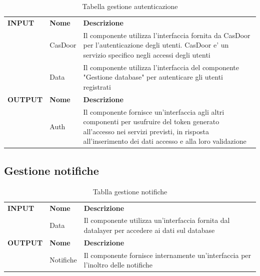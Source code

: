 \documentclass{article}
\begin{document}
\begin{table}[htbp]
    \centering
    \renewcommand{\arraystretch}{1.3} %
    \begin{tabularx}{\textwidth}{| l | l | X |}
        \Xhline{2pt}
        \textbf{INPUT} & \textbf{Nome} & \textbf{Descrizione} \\
        \Xhline{2pt}
         & CasDoor & Il componente utilizza l'interfaccia fornita da CasDoor per l'autenticazione degli utenti. CasDoor e' un servizio specifico negli accessi degli utenti \\
        \hline
         & Data & Il componente utilizza l’interfaccia del componente "Gestione database" per autenticare gli utenti registrati \\
        \Xhline{2pt}
        \textbf{OUTPUT} & \textbf{Nome} & \textbf{Descrizione} \\
        \Xhline{2pt}
         & Auth & Il componente fornisce un'interfaccia agli altri componenti per usufruire del token generato all'accesso nei servizi previsti, in risposta all’inserimento dei dati accesso e alla loro validazione \\
        \hline
    \end{tabularx}
    \caption{Tabella gestione autenticazione}
\end{table}

\clearpage

\subsection{Gestione notifiche}

\begin{table}[htbp]
    \centering
    \renewcommand{\arraystretch}{1.3} %
    \begin{tabularx}{\textwidth}{| l | l | X |}
        \Xhline{2pt}
        \textbf{INPUT} & \textbf{Nome} & \textbf{Descrizione} \\
        \Xhline{2pt}
         & Data & Il componente utilizza un'interfaccia fornita dal datalayer per accedere ai dati sul database \\
        \Xhline{2pt}
        \textbf{OUTPUT} & \textbf{Nome} & \textbf{Descrizione} \\
        \Xhline{2pt}
         & Notifiche & Il componente fornisce internamente un'interfaccia per l'inoltro delle notifiche \\
        \hline
    \end{tabularx}
    \caption{Tablla gestione notifiche}
\end{table}
\end{document}
